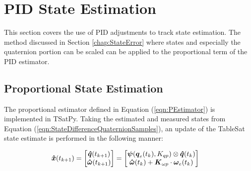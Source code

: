 \section{PID State Estimation}
\label{sec:BodyRatePIDEstimation}

This section covers the use of PID adjustments to track state estimation.  The method discussed in Section \ref{chap:StateError} where states and especially the quaternion portion can be scaled can be applied to the proportional term of the PID estimator.

\subsection{Proportional State Estimation}
\label{subsec:ProportionalEstimator}

The proportional estimator defined in Equation (\ref{eqn:PEstimator}) is implemented in TSatPy.  Taking the estimated and measured states from Equation (\ref{eqn:StateDifferenceQuaternionSamples}), an update of the TableSat state estimate is performed in the following manner:

\begin{equation}
  \begin{aligned}
    \boldsymbol{\hat{x}}(t_{k+1}) &= \begin{bmatrix} \boldsymbol{\hat{q}}(t_{k+1}) \\ \boldsymbol{\hat{\omega}}(t_{k+1}) \end{bmatrix} = \begin{bmatrix} \boldsymbol{\psi}(\boldsymbol{q}_e(t_{k}), K_{qp}) \otimes \boldsymbol{\hat{q}}(t_{k}) \\  \boldsymbol{\hat{\omega}}(t_{k}) + \boldsymbol{K}_{\omega p} \cdot \boldsymbol{\omega}_e(t_{k}) \end{bmatrix}
  \end{aligned}
  \label{eqn:PEstimator}
\end{equation}


